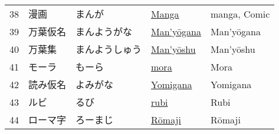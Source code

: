 \begin{longtable}[c]{p{.5cm}p{3.5cm}p{4cm}p{3.5cm}p{3.5cm}}
38&漫画&まんが&\hyperref[sec:Manga]{Manga}&manga, Comic\\
39&万葉仮名&まんようがな&\hyperref[sec:Manyogana]{Man'yōgana}&Man'yōgana\\
40&万葉集&まんようしゅう&\hyperref[sec:Manyoshu]{Man'yōshu}&Man'yōshu\\
41&モーラ&もーら&\hyperref[sec:Mora]{mora}&Mora\\
42&読み仮名&よみがな&\hyperref[sec:Yomigana]{Yomigana}&Yomigana\\
43&ルビ&るび&\hyperref[sec:Rubi]{rubi}&Rubi\\
44&ローマ字&ろーまじ&\hyperref[sec:Romaji]{Rōmaji}&Rōmaji\\
\end{longtable}
